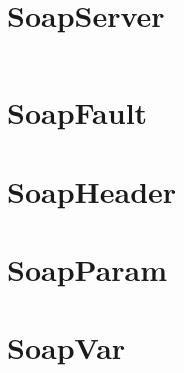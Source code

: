 \chapter{SoapServer}

\begin{lstlisting}[language=PHP]

\end{lstlisting}


\chapter{SoapFault}


\chapter{SoapHeader}


\chapter{SoapParam}


\chapter{SoapVar}